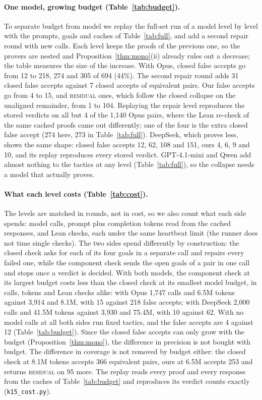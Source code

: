 \documentclass[10pt]{article}
\theoremstyle{definition}
\newcommand{\V}[1]{\textsc{#1}}
\begin{document}
\paragraph{One model, growing budget (Table~\ref{tab:budget}).} To separate budget from model we
replay the full-set run of a model level by level with the prompts, goals and caches of
Table~\ref{tab:full}, and add a second repair round with new calls. Each level keeps the proofs of
the previous one, so the provers are nested and Proposition~\ref{thm:mono}(ii) already rules out a
decrease; the table measures the size of the increase. With Opus, closed false accepts go from 12
to 218, 274 and 305 of 694 (44\%). The second repair round adds 31 closed false accepts against 7
closed accepts of equivalent pairs. Our false accepts go from 4 to 15, and \V{residual} ones,
which follow the closed collapse on the unaligned remainder, from 1 to 104. Replaying the repair level reproduces the stored verdicts on all but 4 of the 1,140 Opus
pairs, where the Lean re-check of the same cached proofs came out differently; one of the four
is the extra closed false accept (274 here, 273 in Table~\ref{tab:full}). DeepSeek, which proves
less, shows the same shape: closed false accepts 12, 62, 108 and 151, ours 4, 6, 9 and 10, and
its replay reproduces every stored verdict. GPT-4.1-mini and Qwen
add almost nothing to the tactics at any level (Table~\ref{tab:full}), so the collapse needs a
model that actually proves.

\paragraph{What each level costs (Table~\ref{tab:cost}).} The levels are matched in rounds, not in
cost, so we also count what each side spends: model calls, prompt plus completion tokens read
from the cached responses, and Lean checks, each under the same heartbeat limit (the runner does
not time single checks). The two sides spend differently by construction: the closed check asks
for each of its four goals in a separate call and repairs every failed one, while the component
check sends the open goals of a pair in one call and stops once a verdict is decided. With both
models, the component check at its largest budget costs less than the closed check at its smallest
model budget, in calls, tokens and Lean checks alike: with Opus 1{,}747 calls and 6.5M tokens
against 3{,}914 and 8.1M, with 15 against 218 false accepts; with DeepSeek 2{,}000 calls and 41.5M
tokens against 3{,}930 and 75.4M, with 10 against 62. With no model calls at all both sides run
fixed tactics, and the false accepts are 4 against 12 (Table~\ref{tab:budget}). Since the closed
false accepts can only grow with the budget (Proposition~\ref{thm:mono}), the difference in
precision is not bought with budget. The difference in coverage is not removed by budget either:
the closed check at 8.1M tokens accepts 366 equivalent pairs, ours at 6.5M accepts 253 and returns
\V{residual} on 95 more. The replay reads every proof and every response from the caches of
Table~\ref{tab:budget} and reproduces its verdict counts exactly (\texttt{k15\_cost.py}).
\end{document}
